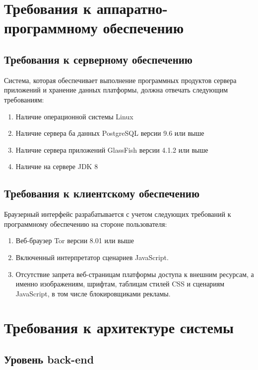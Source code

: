 \documentclass[12pt, a4paper]{article}
\begin{document}
\section{Требования к аппаратно-программному обеспечению}

\subsection{Требования к серверному обеспечению}

Система, которая обеспечивает выполнение программных продуктов сервера 
приложений и хранение данных платформы, должна отвечать следующим требованиям:

\begin{enumerate}
\item Наличие операционной системы Linux
\item Наличие сервера ба данных PostgreSQL версии 9.6 или выше
\item Наличие сервера приложений GlassFish версии 4.1.2 или выше
\item Наличие на сервере JDK 8
\end{enumerate}

\subsection{Требования к клиентскому обеспечению}

Браузерный интерфейс разрабатывается с учетом следующих требований к
программному обеспечению на стороне пользователя:

\begin{enumerate}
\item Веб-браузер Tor версии 8.01 или выше
\item Включенный интерпретатор сценариев JavaScript.
\item Отсутствие запрета веб-страницам платформы доступа к внешним ресурсам,
  а именно изображениям, шрифтам, таблицам стилей CSS и сценариям JavaScript,
  в том числе блокировщиками рекламы.
\end{enumerate}

\section{Требования к архитектуре системы}

\subsection{Уровень back-end}
\end{document}
